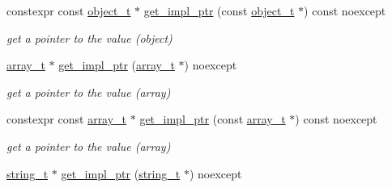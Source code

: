 \begin{DoxyCompactItemize}
\hypertarget{classnlohmann_1_1basic__json_aacd263e4794949bf6e6553e17c3c0577}{}\label{classnlohmann_1_1basic__json_aacd263e4794949bf6e6553e17c3c0577} 
constexpr const \hyperlink{classnlohmann_1_1basic__json_a0ac9894c9de8dc551cf2e5f1c605537f}{object\+\_\+t} $\ast$ \hyperlink{classnlohmann_1_1basic__json_aacd263e4794949bf6e6553e17c3c0577}{get\+\_\+impl\+\_\+ptr} (const \hyperlink{classnlohmann_1_1basic__json_a0ac9894c9de8dc551cf2e5f1c605537f}{object\+\_\+t} $\ast$) const noexcept
\begin{DoxyCompactList}\small\item\em get a pointer to the value (object) \end{DoxyCompactList}\item 
\hypertarget{classnlohmann_1_1basic__json_a938efb5baa975709ba2b24fe58eecb0e}{}\label{classnlohmann_1_1basic__json_a938efb5baa975709ba2b24fe58eecb0e} 
\hyperlink{classnlohmann_1_1basic__json_ab00b882d39306d663c23dab110f5cae0}{array\+\_\+t} $\ast$ \hyperlink{classnlohmann_1_1basic__json_a938efb5baa975709ba2b24fe58eecb0e}{get\+\_\+impl\+\_\+ptr} (\hyperlink{classnlohmann_1_1basic__json_ab00b882d39306d663c23dab110f5cae0}{array\+\_\+t} $\ast$) noexcept
\begin{DoxyCompactList}\small\item\em get a pointer to the value (array) \end{DoxyCompactList}\item 
\hypertarget{classnlohmann_1_1basic__json_a15088d148afe91cd2e29699ac54a1adb}{}\label{classnlohmann_1_1basic__json_a15088d148afe91cd2e29699ac54a1adb} 
constexpr const \hyperlink{classnlohmann_1_1basic__json_ab00b882d39306d663c23dab110f5cae0}{array\+\_\+t} $\ast$ \hyperlink{classnlohmann_1_1basic__json_a15088d148afe91cd2e29699ac54a1adb}{get\+\_\+impl\+\_\+ptr} (const \hyperlink{classnlohmann_1_1basic__json_ab00b882d39306d663c23dab110f5cae0}{array\+\_\+t} $\ast$) const noexcept
\begin{DoxyCompactList}\small\item\em get a pointer to the value (array) \end{DoxyCompactList}\item 
\hypertarget{classnlohmann_1_1basic__json_a090ba5bc0868dbb7cc7af0e610004625}{}\label{classnlohmann_1_1basic__json_a090ba5bc0868dbb7cc7af0e610004625} 
\hyperlink{classnlohmann_1_1basic__json_ab63e618bbb0371042b1bec17f5891f42}{string\+\_\+t} $\ast$ \hyperlink{classnlohmann_1_1basic__json_a090ba5bc0868dbb7cc7af0e610004625}{get\+\_\+impl\+\_\+ptr} (\hyperlink{classnlohmann_1_1basic__json_ab63e618bbb0371042b1bec17f5891f42}{string\+\_\+t} $\ast$) noexcept

\end{DoxyCompactItemize}
